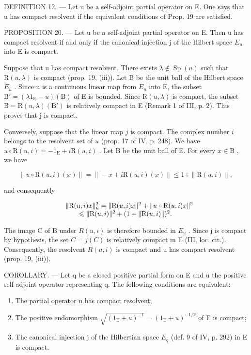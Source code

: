 DEFINITION 12. --- Let u be a self-adjoint partial operator on E. One says that u has compact resolvent if the equivalent conditions of Prop. 19 are satisfied.

PROPOSITION 20. --- Let u be a self-adjoint partial operator on E. Then u has compact resolvent if and only if the canonical injection j of the Hilbert space \(E_{u}\) into E is compact.

Suppose that u has compact resolvent. There exists \(\lambda \notin \operatorname{Sp}(u)\) such that \(\mathrm{R}(u, \lambda)\) is compact (prop. 19, (iii)). Let B be the unit ball of the Hilbert space \(E_{u}\) . Since u is a continuous linear map from \(E_{u}\) into E, the subset \(\mathrm{B}' = (\lambda 1_{\mathrm{E}} - u)(\mathrm{B})\) of E is bounded. Since \(\mathrm{R}(u, \lambda)\) is compact, the subset \(\mathrm{B} = \mathrm{R}(u, \lambda)(\mathrm{B}')\) is relatively compact in E (Remark 1 of III, p. 2). This proves that j is compact.

Conversely, suppose that the linear map \(j\) is compact. The complex number \(i\) belongs to the resolvent set of \(u\) (prop. 17 of IV, p. 248). We have \(u \circ \mathrm{R}(u, i) = -1_{\mathrm{E}} + i\mathrm{R}(u, i)\) . Let B be the unit ball of E. For every \(x \in \mathrm{B}\) , we have

\[
\| u \circ \mathrm{R} (u, i) (x) \| = \| - x + i \mathrm{R} (u, i) (x) \| \leqslant 1 + \| \mathrm{R} (u, i) \|,
\]

and consequently

\[
\begin{array}{r l} & {\| \mathrm{R} (u, i) x \| _ {u} ^ {2} = \| \mathrm{R} (u, i) x \| ^ {2} + \| u \circ \mathrm{R} (u, i) x \| ^ {2}} \\ & {\qquad \leqslant \| \mathrm{R} (u, i) \| ^ {2} + (1 + \| \mathrm{R} (u, i) \|) ^ {2}.} \end{array}
\]

The image C of B under \(R(u,i)\) is therefore bounded in \(E_{u}\) . Since j is compact by hypothesis, the set \(C = j(C)\) is relatively compact in E (III, loc. cit.). Consequently, the resolvent \(R(u,i)\) is compact and u has compact resolvent (prop. 19, (iii)).

COROLLARY. --- Let q be a closed positive partial form on E and u the positive self-adjoint operator representing q. The following conditions are equivalent:

\begin{enumerate}
\def\labelenumi{(\roman{enumi})}
\item
  The partial operator u has compact resolvent;
\item
  The positive endomorphism \(\sqrt{(1_{\mathrm{E}} + u)^{-1}} = (1_{\mathrm{E}} + u)^{-1 / 2}\) of E is compact;
\item
  The canonical injection j of the Hilbertian space \(E_{q}\) (def. 9 of IV, p. 292) in E is compact.
\end{enumerate}

